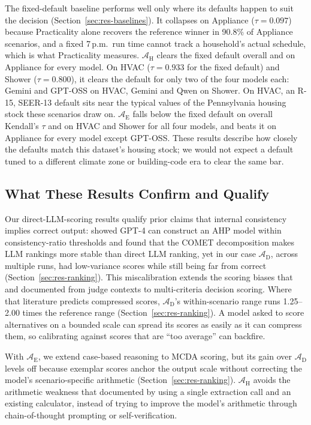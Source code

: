 \documentclass[final,3p,times]{elsarticle}
\begin{document}
The fixed-default baseline performs well only where its defaults happen to suit the decision (Section~\ref{sec:res-baselines}). It collapses on Appliance ($\tau = 0.097$) because Practicality alone recovers the reference winner in 90.8\% of Appliance scenarios, and a fixed 7\,p.m.\ run time cannot track a household's actual schedule, which is what Practicality measures. $\mathcal{A}_{\text{H}}$ clears the fixed default overall and on Appliance for every model. On HVAC ($\tau = 0.933$ for the fixed default) and Shower ($\tau = 0.800$), it clears the default for only two of the four models each: Gemini and GPT-OSS on HVAC, Gemini and Qwen on Shower. On HVAC, an R-15, SEER-13 default sits near the typical values of the Pennsylvania housing stock these scenarios draw on. $\mathcal{A}_{\text{E}}$ falls below the fixed default on overall Kendall's $\tau$ and on HVAC and Shower for all four models, and beats it on Appliance for every model except GPT-OSS. These results describe how closely the defaults match this dataset's housing stock; we would not expect a default tuned to a different climate zone or building-code era to clear the same bar.

\FloatBarrier
\subsection{What These Results Confirm and Qualify}
\label{sec:comparison}

Our direct-LLM-scoring results qualify prior claims that internal consistency implies correct output: \citet{svoboda2024} showed GPT-4 can construct an AHP model within consistency-ratio thresholds and \citet{icaart26} found that the COMET decomposition makes LLM rankings more stable than direct LLM ranking, yet in our case $\mathcal{A}_{\text{D}}$, across multiple runs, had low-variance scores while still being far from correct (Section~\ref{sec:res-ranking}). This miscalibration extends the scoring biases that \citet{wang2024fairescalers} and \citet{li2026scoringbias} documented from judge contexts to multi-criteria decision scoring. Where that literature predicts compressed scores, $\mathcal{A}_{\text{D}}$'s within-scenario range runs 1.25--2.00 times the reference range (Section~\ref{sec:res-ranking}). A model asked to score alternatives on a bounded scale can spread its scores as easily as it can compress them, so calibrating against scores that are ``too average'' can backfire.

With $\mathcal{A}_{\text{E}}$, we extend case-based reasoning \cite{aamodtplaza1994,minorkaucher2024} to MCDA scoring, but its gain over $\mathcal{A}_{\text{D}}$ levels off because exemplar scores anchor the output scale without correcting the model's scenario-specific arithmetic (Section~\ref{sec:res-ranking}). $\mathcal{A}_{\text{H}}$ avoids the arithmetic weakness that \citet{imani2023mathprompter} documented by using a single extraction call and an existing calculator, instead of trying to improve the model's arithmetic through chain-of-thought prompting \cite{wei2022cot} or self-verification.
\end{document}

